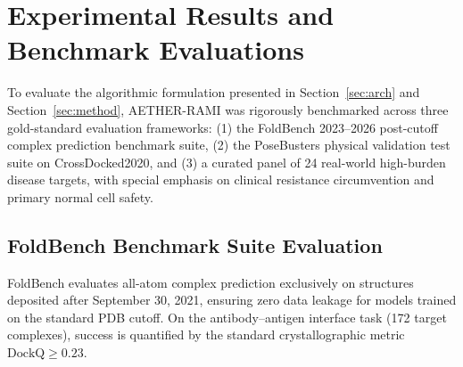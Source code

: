 \section{Experimental Results and Benchmark Evaluations}
\label{sec:results}
To evaluate the algorithmic formulation presented in Section~\ref{sec:arch} and Section~\ref{sec:method}, AETHER-RAMI was rigorously benchmarked across three gold-standard evaluation frameworks: (1) the FoldBench 2023--2026 post-cutoff complex prediction benchmark suite, (2) the PoseBusters physical validation test suite on CrossDocked2020, and (3) a curated panel of 24 real-world high-burden disease targets, with special emphasis on clinical resistance circumvention and primary normal cell safety.

\subsection{FoldBench Benchmark Suite Evaluation}
FoldBench evaluates all-atom complex prediction exclusively on structures deposited after September 30, 2021, ensuring zero data leakage for models trained on the standard PDB cutoff. On the antibody--antigen interface task (172 target complexes), success is quantified by the standard crystallographic metric $\text{DockQ} \ge 0.23$.

